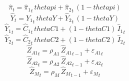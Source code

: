 \begin{dmath}
{{\hat{\pi}}}_{t}={{\hat{\pi}_{1}}}_{t}\, {thetapi}+{{\hat{\pi}_{2}}}_{t}\, \left(1-{thetapi}\right)
\end{dmath}
\begin{dmath}
{{\hat{Y}}}_{t}={{\hat{Y}_{1}}}_{t}\, {thetaY}+{{\hat{Y}_{2}}}_{t}\, \left(1-{thetaY}\right)
\end{dmath}
\begin{dmath}
{{\hat{Y}_{1}}}_{t}={{\hat{C}_{1}}}_{t}\, {thetaC1}+\left(1-{thetaC1}\right)\, {{\hat{I}_{1}}}_{t}
\end{dmath}
\begin{dmath}
{{\hat{Y}_{2}}}_{t}={{\hat{C}_{2}}}_{t}\, {thetaC2}+\left(1-{thetaC2}\right)\, {{\hat{I}_{2}}}_{t}
\end{dmath}
\begin{dmath}
{{\hat{Z}_{A1}}}_{t}={{\rho_{A1}}}\, {{\hat{Z}_{A1}}}_{t-1}+{{\varepsilon_{A1}}}_{t}
\end{dmath}
\begin{dmath}
{{\hat{Z}_{A2}}}_{t}={{\rho_{A2}}}\, {{\hat{Z}_{A2}}}_{t-1}+{{\varepsilon_{A2}}}_{t}
\end{dmath}
\begin{dmath}
{{\hat{Z}_M}}_{t}={{\rho_{M}}}\, {{\hat{Z}_M}}_{t-1}+{{\varepsilon_{M}}}_{t}
\end{dmath}
